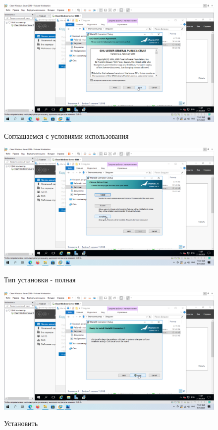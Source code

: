 \documentclass[a4paper]{article}
\begin{document}
  \begin{figure}[H]
    \centering
    \includegraphics[width=\textwidth]{11_0025}
    \label{img:25}
    \caption{Соглашаемся с условиями использования}
  \end{figure}

  \begin{figure}[H]
    \centering
    \includegraphics[width=\textwidth]{11_0026}
    \label{img:26}
    \caption{Тип установки - полная}
  \end{figure}

  \begin{figure}[H]
    \centering
    \includegraphics[width=\textwidth]{11_0027}
    \label{img:27}
    \caption{Установить}
  \end{figure}
\end{document}
